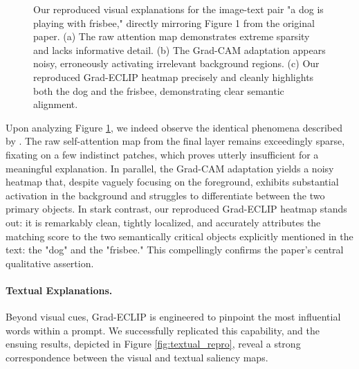 \documentclass[10pt]{article} %
\begin{document}
\begin{figure}[h!]
\centering
\fbox{\rule{0pt}{5cm}\rule{0.9\linewidth}{0pt}}
\caption{Our reproduced visual explanations for the image-text pair "a dog is playing with frisbee," directly mirroring Figure 1 from the original paper. (a) The raw attention map demonstrates extreme sparsity and lacks informative detail. (b) The Grad-CAM adaptation appears noisy, erroneously activating irrelevant background regions. (c) Our reproduced Grad-ECLIP heatmap precisely and cleanly highlights both the dog and the frisbee, demonstrating clear semantic alignment.}
\label{fig:qualitative_repro}
\end{figure}

Upon analyzing Figure \ref{fig:qualitative_repro}, we indeed observe the identical phenomena described by \citet{zhao2024grad}. The raw self-attention map from the final layer remains exceedingly sparse, fixating on a few indistinct patches, which proves utterly insufficient for a meaningful explanation. In parallel, the Grad-CAM adaptation yields a noisy heatmap that, despite vaguely focusing on the foreground, exhibits substantial activation in the background and struggles to differentiate between the two primary objects. In stark contrast, our reproduced Grad-ECLIP heatmap stands out: it is remarkably clean, tightly localized, and accurately attributes the matching score to the two semantically critical objects explicitly mentioned in the text: the "dog" and the "frisbee." This compellingly confirms the paper's central qualitative assertion.

\paragraph{Textual Explanations.}
Beyond visual cues, Grad-ECLIP is engineered to pinpoint the most influential words within a prompt. We successfully replicated this capability, and the ensuing results, depicted in Figure \ref{fig:textual_repro}, reveal a strong correspondence between the visual and textual saliency maps.
\end{document}

